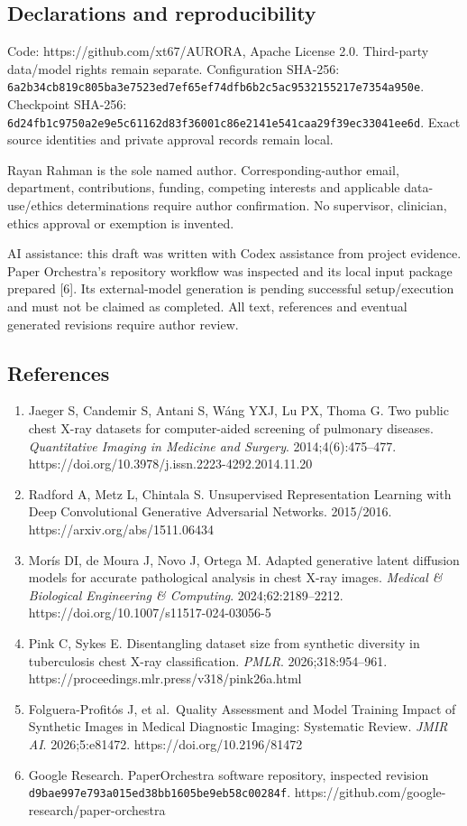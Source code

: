 \documentclass[
]{article}
\providecommand{\tightlist}{%
  \setlength{\itemsep}{0pt}\setlength{\parskip}{0pt}}
\begin{document}
\subsection{Declarations and
reproducibility}\label{declarations-and-reproducibility}

Code: https://github.com/xt67/AURORA, Apache License 2.0. Third-party
data/model rights remain separate. Configuration SHA-256:
\texttt{6a2b34cb819c805ba3e7523ed7ef65ef74dfb6b2c5ac9532155217e7354a950e}.
Checkpoint SHA-256:
\texttt{6d24fb1c9750a2e9e5c61162d83f36001c86e2141e541caa29f39ec33041ee6d}.
Exact source identities and private approval records remain local.

Rayan Rahman is the sole named author. Corresponding-author email,
department, contributions, funding, competing interests and applicable
data-use/ethics determinations require author confirmation. No
supervisor, clinician, ethics approval or exemption is invented.

AI assistance: this draft was written with Codex assistance from project
evidence. Paper Orchestra's repository workflow was inspected and its
local input package prepared {[}6{]}. Its external-model generation is
pending successful setup/execution and must not be claimed as completed.
All text, references and eventual generated revisions require author
review.

\subsection{References}\label{references}

\begin{enumerate}
\def\labelenumi{\arabic{enumi}.}
\tightlist
\item
  Jaeger S, Candemir S, Antani S, Wáng YXJ, Lu PX, Thoma G. Two public
  chest X-ray datasets for computer-aided screening of pulmonary
  diseases. \emph{Quantitative Imaging in Medicine and Surgery}.
  2014;4(6):475--477.
  https://doi.org/10.3978/j.issn.2223-4292.2014.11.20
\item
  Radford A, Metz L, Chintala S. Unsupervised Representation Learning
  with Deep Convolutional Generative Adversarial Networks. 2015/2016.
  https://arxiv.org/abs/1511.06434
\item
  Morís DI, de Moura J, Novo J, Ortega M. Adapted generative latent
  diffusion models for accurate pathological analysis in chest X-ray
  images. \emph{Medical \& Biological Engineering \& Computing}.
  2024;62:2189--2212. https://doi.org/10.1007/s11517-024-03056-5
\item
  Pink C, Sykes E. Disentangling dataset size from synthetic diversity
  in tuberculosis chest X-ray classification. \emph{PMLR}.
  2026;318:954--961. https://proceedings.mlr.press/v318/pink26a.html
\item
  Folguera-Profitós J, et al.~Quality Assessment and Model Training
  Impact of Synthetic Images in Medical Diagnostic Imaging: Systematic
  Review. \emph{JMIR AI}. 2026;5:e81472. https://doi.org/10.2196/81472
\item
  Google Research. PaperOrchestra software repository, inspected
  revision \texttt{d9bae997e793a015ed38bb1605be9eb58c00284f}.
  https://github.com/google-research/paper-orchestra
\end{enumerate}
\end{document}
